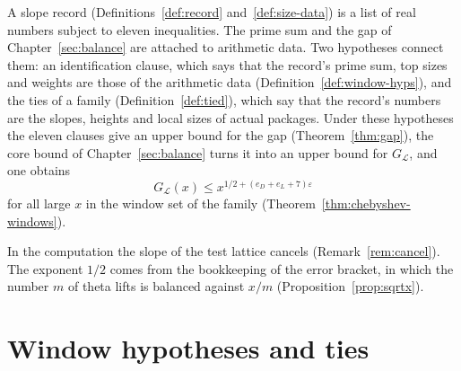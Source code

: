 \documentclass[11pt]{amsbook}
\theoremstyle{plain}
\theoremstyle{definition}
\theoremstyle{remark}
\numberwithin{equation}{section}
\numberwithin{figure}{chapter}
\numberwithin{table}{chapter}
\newcommand{\eps}{\varepsilon}
\newcommand{\lev}{\mathscr{L}}
\begin{document}
A slope record
(Definitions~\ref{def:record} and~\ref{def:size-data}) is a list of
real numbers subject to eleven inequalities. The prime sum and the
gap of Chapter~\ref{sec:balance} are attached to arithmetic data. Two
hypotheses connect them: an identification clause, which says that the
record's prime sum, top sizes and weights are those of the arithmetic
data (Definition~\ref{def:window-hyps}), and the ties of a family
(Definition~\ref{def:tied}), which say that the record's numbers are
the slopes, heights and local sizes of actual packages. Under these
hypotheses the eleven clauses give an upper bound for the gap
(Theorem~\ref{thm:gap}), the core bound of Chapter~\ref{sec:balance}
turns it into an upper bound for $G_\lev$, and one obtains
\[
G_\lev(x)\le x^{1/2+(e_D+e_L+7)\eps}
\]
for all large $x$ in the window set of the family
(Theorem~\ref{thm:chebyshev-windows}).

In the computation the slope of the test lattice cancels
(Remark~\ref{rem:cancel}). The exponent $1/2$ comes from the
bookkeeping of the error bracket, in which the number $m$ of theta
lifts is balanced against $x/m$
(Proposition~\ref{prop:sqrtx}).

\section{Window hypotheses and ties}
\end{document}
